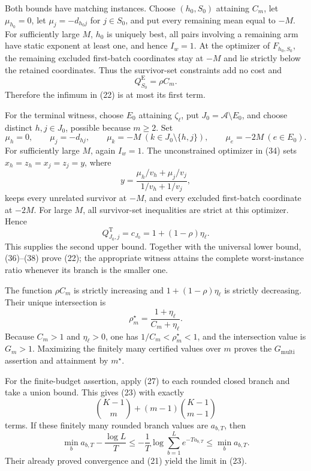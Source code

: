 Both bounds have matching instances. Choose \((h_0,S_0)\) attaining \(C_m\), let \(\mu_{h_0}=0\), let \(\mu_j=-d_{h_0j}\) for \(j\in S_0\), and put every remaining mean equal to \(-M\). For sufficiently large \(M\), \(h_0\) is uniquely best, all pairs involving a remaining arm have static exponent at least one, and hence \(I_w=1\). At the optimizer of \(F_{h_0,S_0}\), the remaining excluded first-batch coordinates stay at \(-M\) and lie strictly below the retained coordinates. Thus the survivor-set constraints add no cost and
\[
 Q_{S_0}^{\mathrm E}=\rho C_m. \tag{36}
\]
Therefore the infimum in (22) is at most its first term.

For the terminal witness, choose \(E_0\) attaining \(\zeta_\ell\), put \(J_0=\mathcal A\setminus E_0\), and choose distinct \(h,j\in J_0\), possible because \(m\ge2\). Set
\[
 \mu_h=0,\qquad \mu_j=-d_{hj},\qquad
 \mu_k=-M\ (k\in J_0\setminus\{h,j\}),\qquad
 \mu_e=-2M\ (e\in E_0). \tag{37}
\]
For sufficiently large \(M\), again \(I_w=1\). The unconstrained optimizer in (34) sets \(x_h=z_h=x_j=z_j=y\), where
\[
 y=\frac{\mu_h/v_h+\mu_j/v_j}{1/v_h+1/v_j},
\]
keeps every unrelated survivor at \(-M\), and every excluded first-batch coordinate at \(-2M\). For large \(M\), all survivor-set inequalities are strict at this optimizer. Hence
\[
 Q_{J_0,j}^{\mathrm T}=c_{J_0}=1+(1-\rho)\eta_\ell. \tag{38}
\]
This supplies the second upper bound. Together with the universal lower bound, (36)--(38) prove (22); the appropriate witness attains the complete worst-instance ratio whenever its branch is the smaller one.

The function \(\rho C_m\) is strictly increasing and \(1+(1-\rho)\eta_\ell\) is strictly decreasing. Their unique intersection is
\[
 \rho_m^\star=\frac{1+\eta_\ell}{C_m+\eta_\ell}.
\]
Because \(C_m>1\) and \(\eta_\ell>0\), one has \(1/C_m<\rho_m^\star<1\), and the intersection value is \(G_m>1\). Maximizing the finitely many certified values over \(m\) proves the \(G_{\mathrm{multi}}\) assertion and attainment by \(m^\star\).

For the finite-budget assertion, apply (27) to each rounded closed branch and take a union bound. This gives (23) with exactly
\[
 \binom{K-1}{m}+(m-1)\binom{K-1}{m-1}
\]
terms. If these finitely many rounded branch values are \(a_{b,T}\), then
\[
 \min_b a_{b,T}-\frac{\log L}{T}
 \le-\frac1T\log\sum_{b=1}^L e^{-Ta_{b,T}}
 \le\min_b a_{b,T}.
\]
Their already proved convergence and (21) yield the limit in (23).


